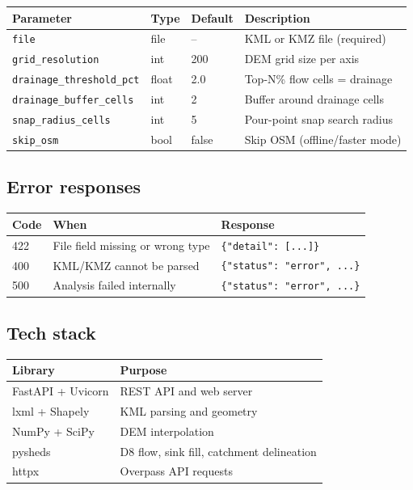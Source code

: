 \documentclass[12pt,a4paper]{article}
\begin{document}
\begin{center}
\begin{tabular}{llll}
\toprule
Parameter & Type & Default & Description \\
\midrule
\texttt{file}                    & file  & --    & KML or KMZ file (required) \\
\texttt{grid\_resolution}        & int   & 200   & DEM grid size per axis \\
\texttt{drainage\_threshold\_pct}& float & 2.0   & Top-N\% flow cells = drainage \\
\texttt{drainage\_buffer\_cells} & int   & 2     & Buffer around drainage cells \\
\texttt{snap\_radius\_cells}     & int   & 5     & Pour-point snap search radius \\
\texttt{skip\_osm}               & bool  & false & Skip OSM (offline/faster mode) \\
\bottomrule
\end{tabular}
\end{center}

\subsection*{Error responses}

\begin{center}
\begin{tabular}{lll}
\toprule
Code & When & Response \\
\midrule
422 & File field missing or wrong type & \texttt{\{"detail": [...]\}} \\
400 & KML/KMZ cannot be parsed         & \texttt{\{"status": "error", ...\}} \\
500 & Analysis failed internally        & \texttt{\{"status": "error", ...\}} \\
\bottomrule
\end{tabular}
\end{center}

\subsection*{Tech stack}

\begin{center}
\begin{tabular}{ll}
\toprule
Library & Purpose \\
\midrule
FastAPI + Uvicorn & REST API and web server \\
lxml + Shapely    & KML parsing and geometry \\
NumPy + SciPy     & DEM interpolation \\
pysheds           & D8 flow, sink fill, catchment delineation \\
httpx             & Overpass API requests \\
\bottomrule
\end{tabular}
\end{center}
\end{document}
